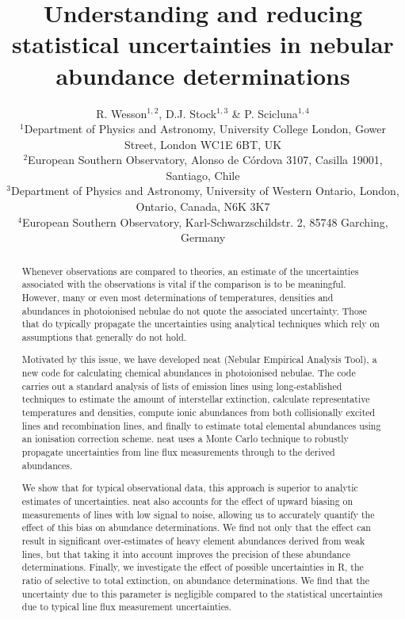 \documentclass[useAMS,usenatbib]{mn2e}
\title[Statistical uncertainties in nebular abundances]{Understanding and reducing statistical uncertainties in nebular abundance determinations} %
\author[R. Wesson et al.]{R. Wesson$^{1,2}$, D.J. Stock$^{1,3}$ \& P. Scicluna$^{1,4}$\\
$^1$Department of Physics and Astronomy, University College London, Gower Street, London WC1E 6BT, UK\\
$^2$European Southern Observatory, Alonso de C\'ordova 3107, Casilla 19001, Santiago, Chile\\
$^3$Department of Physics and Astronomy, University of Western Ontario, London, Ontario, Canada, N6K 3K7\\
$^4$European Southern Observatory, Karl-Schwarzschildstr. 2, 85748 Garching, Germany\\ 
}
\begin{document}
\date{}

\pagerange{\pageref{firstpage}--\pageref{lastpage}} 

\maketitle

\label{firstpage}

\begin{abstract}
Whenever observations are compared to theories, an estimate of the uncertainties associated with the observations is vital if the comparison is to be meaningful.  However, many or even most determinations of temperatures, densities and abundances in photoionised nebulae do not quote the associated uncertainty.  Those that do typically propagate the uncertainties using analytical techniques which rely on assumptions that generally do not hold.

Motivated by this issue, we have developed {\sc neat} (Nebular Empirical Analysis Tool), a new code for calculating chemical abundances in photoionised nebulae.  The code carries out a standard analysis of lists of emission lines using long-established techniques to estimate the amount of interstellar extinction, calculate representative temperatures and densities, compute ionic abundances from both collisionally excited lines and recombination lines, and finally to estimate total elemental abundances using an ionisation correction scheme.  {\sc neat} uses a Monte Carlo technique to robustly propagate uncertainties from line flux measurements through to the derived abundances.

We show that for typical observational data, this approach is superior to analytic estimates of uncertainties.  {\sc neat} also accounts for the effect of upward biasing on measurements of lines with low signal to noise, allowing us to accurately quantify the effect of this bias on abundance determinations.  We find not only that the effect can result in significant over-estimates of heavy element abundances derived from weak lines, but that taking it into account improves the precision of these abundance determinations.  Finally, we investigate the effect of possible uncertainties in R, the ratio of selective to total extinction, on abundance determinations.  We find that the uncertainty due to this parameter is negligible compared to the statistical uncertainties due to typical line flux measurement uncertainties.

\end{abstract}
\end{document}

